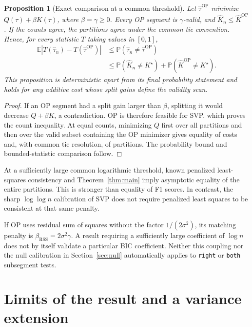 \documentclass[pdflatex,sn-mathphys-num]{sn-jnl}
\newcommand{\Prob}{\mathbb P}
\newcommand{\E}{\mathbb E}
\newcommand{\Kh}{\widehat K_n}
\newcommand{\tht}{\widehat\tau_n}
\theoremstyle{thmstyleone}
\newtheorem{proposition}[theorem]{Proposition}
\theoremstyle{thmstyletwo}
\begin{document}
\begin{proposition}[Exact comparison at a common threshold]\label{prop:coupling}
Let $\widehat\tau^{\mathrm{OP}}$ minimize $Q(\tau)+\beta K(\tau)$, where
$\beta=\gamma\ge0$. Every OP segment is $\gamma$-valid, and
$\Kh\le\widehat K^{\mathrm{OP}}$. If the counts agree, the partitions agree
under the common tie convention. Hence, for every statistic $T$ taking
values in $[0,1]$,
\begin{align}\label{eq:coupling}
\E|T(\tht)-T(\widehat\tau^{\mathrm{OP}})|
&\le\Prob(\tht\ne\widehat\tau^{\mathrm{OP}})\nonumber\\
&\le\Prob(\Kh\ne K^\star)+\Prob(\widehat K^{\mathrm{OP}}\ne K^\star).
\end{align}
This proposition is deterministic apart from its final probability statement
and holds for any additive cost whose split gains define the validity scan.
\end{proposition}
\begin{proof}
If an OP segment had a split gain larger than $\beta$, splitting it would
decrease $Q+\beta K$, a contradiction. OP is therefore feasible for SVP,
which proves the count inequality. At equal counts, minimizing $Q$ first
over all partitions and then over the valid subset containing the OP
minimizer gives equality of costs and, with common tie resolution, of
partitions. The probability bound and bounded-statistic comparison follow.
\end{proof}

At a sufficiently large common logarithmic threshold, known penalized
least-squares consistency and Theorem~\ref{thm:main} imply asymptotic equality
of the entire partitions. This is stronger than equality of F1 scores.
In contrast, the sharp $\log\log n$ calibration of SVP does not require
penalized least squares to be consistent at that same penalty.

If OP uses residual sum of squares without the factor $1/(2\sigma^2)$,
its matching penalty is $\beta_{\mathrm{RSS}}=2\sigma^2\gamma$.
A result requiring a sufficiently large coefficient of $\log n$ does not
by itself validate a particular BIC coefficient. Neither this coupling nor
the null calibration in Section~\ref{sec:null} automatically applies to
\texttt{right} or \texttt{both} subsegment tests.

\section{Limits of the result and a variance extension}\label{sec:limits}
\end{document}

